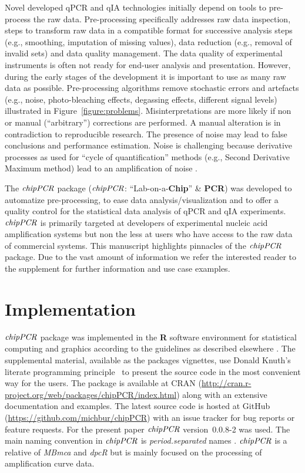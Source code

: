 \documentclass[twocolumn]{bmcart}%
\begin{document}
Novel developed qPCR and qIA technologies initially depend on tools to 
pre-process the raw data. Pre-processing specifically addresses raw data 
inspection, steps to transform raw data in a compatible format for successive 
analysis steps (e.g., smoothing, imputation of missing values), data reduction 
(e.g., removal of invalid sets) and data quality management. The data quality of 
experimental instruments is often not ready for end-user analysis and 
presentation. However, during the early stages of the development it is 
important to use as many raw data as possible. Pre-processing algorithms remove 
stochastic errors and artefacts (e.g., noise, photo-bleaching effects, degassing 
effects, different signal levels) illustrated in Figure~\ref{figure:problems}. 
Misinterpretations are more likely if non or manual (``arbitrary'') corrections 
are performed. A manual alteration is in contradiction to reproducible research. 
The presence of noise may lead to false conclusions and performance estimation. 
Noise is challenging because derivative processes as used for ``cycle of 
quantification'' methods (e.g., Second Derivative Maximum method) lead to an 
amplification of noise \cite{ruijter_2013, tellinghuisen_2014,roediger_RJ_2013, 
larionov_2005, tuomi_2010}.

The $\emph{chipPCR}$ package ($\emph{chipPCR}$: ``Lab-on-a-\textbf{Chip}'' \& 
\textbf{PCR}) was developed to automatize pre-processing, to ease data 
analysis/visualization and to offer a quality control for the statistical data 
analysis of qPCR and qIA experiments. $\emph{chipPCR}$ is primarily targeted at 
developers of experimental nucleic acid amplification systems but non the less 
at users who have access to the raw data of commercial systems. This manuscript
highlights pinnacles of the $\emph{chipPCR}$ package. Due to the vast 
amount of information we refer the interested reader to the supplement for further 
information and use case examples.

\section*{Implementation}

$\emph{chipPCR}$ package was implemented in the \textbf{R} software environment 
for statistical computing and graphics according to the guidelines as described 
elsewhere \cite{RDCT2014a}. The supplemental material, available as the packages 
vignettes, use Donald Knuth's literate programming principle~\cite{Knuth1984} to 
present the source code in the most convenient way for the users. The package is 
available at CRAN 
(\url{http://cran.r-project.org/web/packages/chipPCR/index.html}) along with an 
extensive documentation and examples. The latest source code is hosted at GitHub 
(\url{https://github.com/michbur/chipPCR}) with an issue tracker for bug reports 
or feature requests. For the present paper $\emph{chipPCR}$ version~0.0.8-2 was 
used. The main naming convention in $\emph{chipPCR}$ is 
\textit{period.separated} names \cite{Baaaath_2012}. $\emph{chipPCR}$ is a 
relative of \emph{MBmca} \cite{roediger_RJ_2013} and \emph{dpcR} but is mainly 
focused on the processing of amplification curve data.
\end{document}

